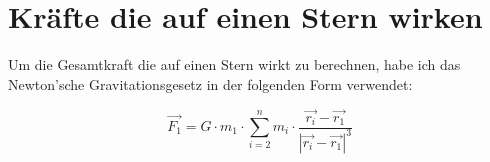 \section*{Kräfte die auf einen Stern wirken}

Um die Gesamtkraft die auf einen Stern wirkt zu berechnen, habe ich
das Newton'sche Gravitationsgesetz in der folgenden Form verwendet:

\begin{equation}
  \vec{F_1} = G \cdot m_1 \cdot \sum_{i=2}^n m_i \cdot
  \frac{\vec{r_i} - \vec{r_1}}{| \vec{r_i} - \vec{r_1} |^3}
\end{equation}\vspace{-1cm}
